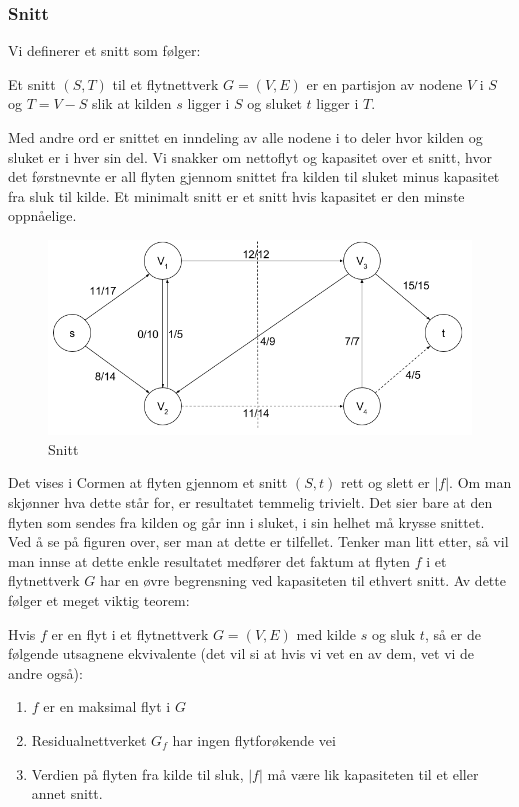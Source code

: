 \subsubsection{Snitt}
Vi definerer et snitt som følger:
\begin{center}
    Et snitt $(S,T)$ til et flytnettverk $G = (V,E)$ er en partisjon av nodene $V$ i $S$ og $T = V - S$ slik at kilden $s$ ligger i $S$ og sluket $t$ ligger i $T$.
\end{center}
\noindent Med andre ord er snittet en inndeling av alle nodene i to deler hvor kilden og sluket er i hver sin del. Vi snakker om nettoflyt og kapasitet over et snitt, hvor det førstnevnte er all flyten gjennom snittet fra kilden til sluket minus kapasitet fra sluk til kilde. Et minimalt snitt er et snitt hvis kapasitet er den minste oppnåelige.

\begin{figure}[H]
\includegraphics[scale=0.6]{images/snitt}
\centering %
\caption{Snitt}
\label{fig:snitt}
\end{figure}

\noindent Det vises i Cormen at flyten gjennom et snitt $(S,t)$ rett og slett er $|f|$. Om man skjønner hva dette står for, er resultatet temmelig trivielt. Det sier bare at den flyten som sendes fra kilden og går inn i sluket, i sin helhet må krysse snittet. Ved å se på figuren over, ser man at dette er tilfellet. Tenker man litt etter, så vil man innse at dette enkle resultatet medfører det faktum at flyten $f$ i et flytnettverk $G$ har en øvre begrensning ved kapasiteten til ethvert snitt. Av dette følger et meget viktig teorem:
\begin{center}
    Hvis $f$ er en flyt i et flytnettverk $G = (V,E)$ med kilde $s$ og sluk $t$, så er de følgende utsagnene ekvivalente (det vil si at hvis vi vet en av dem, vet vi de andre også):
    \begin{enumerate}
         \item $f$ er en maksimal flyt i $G$
        \item Residualnettverket $G_f$ har ingen flytforøkende vei
        \item Verdien på flyten fra kilde til sluk, $|f|$ må være lik kapasiteten til et eller annet snitt.
    \end{enumerate}
\end{center}

